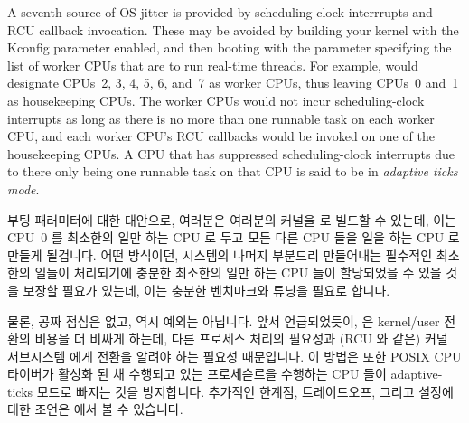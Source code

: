 A seventh source of OS jitter is provided by
scheduling-clock interrrupts and RCU callback invocation.
These may be avoided by building your kernel with the
 Kconfig parameter enabled, and then booting
with the  parameter specifying the list of
worker CPUs that are to run real-time threads.
For example,  would designate CPUs~2, 3, 4, 5, 6, and~7
as worker CPUs, thus leaving CPUs~0 and~1 as housekeeping CPUs.
The worker CPUs would not incur scheduling-clock interrupts as long
as there is no more than one runnable task on each worker CPU,
and each worker CPU's RCU callbacks would be invoked on one of the
housekeeping CPUs.
A CPU that has suppressed scheduling-clock interrupts due to there
only being one runnable task on that CPU is said to be in
\emph{adaptive ticks mode}.
\fi

 부팅 패러미터에 대한 대안으로, 여러분은 여러분의 커널을
 로 빌드할 수 있는데, 이는 CPU~0 를 최소한의 일만 하는 CPU
로 두고 모든 다른 CPU 들을 일을 하는 CPU 로 만들게 될겁니다.
어떤 방식이던, 시스템의 나머지 부분드리 만들어내는 필수적인 최소한의 일들이
처리되기에 충분한 최소한의 일만 하는 CPU 들이 할당되었을 수 있을 것을 보장할
필요가 있는데, 이는 충분한 벤치마크와 튜닝을 필요로 합니다.

물론, 공짜 점심은 없고,  역시 예외는 아닙니다.
앞서 언급되었듯이,  은 kernel/user 전환의 비용을 더 비싸게
하는데, 다른 프로세스 처리의 필요성과 (RCU 와 같은) 커널 서브시스템 에게 전환을
알려야 하는 필요성 때문입니다.
이 방법은 또한 POSIX CPU 타이버가 활성화 된 채 수행되고 있는 프로세슫르을
수행하는 CPU 들이 adaptive-ticks 모드로 빠지는 것을 방지합니다.
추가적인 한계점, 트레이드오프, 그리고 설정에 대한 조언은
 에서 볼 수 있습니다.

